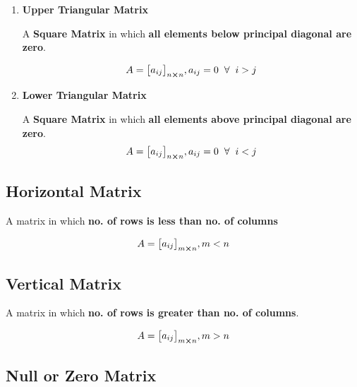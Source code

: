 \documentclass{article}
\begin{document}
\begin{enumerate}
    \item \textbf{Upper Triangular Matrix}

          A \textbf{Square Matrix} in which \textbf{all elements below principal diagonal are zero}.

          $$A={\begin{bmatrix}
                  a_{ij}
              \end{bmatrix}}_{n \cross n}, a_{ij}=0 \hspace{2mm} \forall \hspace{2mm} i >j $$

    \item \textbf{Lower Triangular Matrix}

          A \textbf{Square Matrix} in which \textbf{all elements above principal diagonal are zero}.
          $$A={\begin{bmatrix}
                  a_{ij}
              \end{bmatrix}}_{n \cross n}, a_{ij}=0 \hspace{2mm} \forall \hspace{2mm} i<j $$
\end{enumerate}

\subsection{Horizontal Matrix}

A matrix in which \textbf{no. of rows is less than no. of columns}

$$A={\begin{bmatrix}
        a_{ij}
    \end{bmatrix}}_{m \cross n}, m <n  $$

\subsection{Vertical Matrix}

A matrix in which \textbf{no. of rows is greater than no. of columns}.

$$A={\begin{bmatrix}
        a_{ij}
    \end{bmatrix}}_{m \cross n}, m>n $$

\subsection{Null or Zero Matrix}
\end{document}
